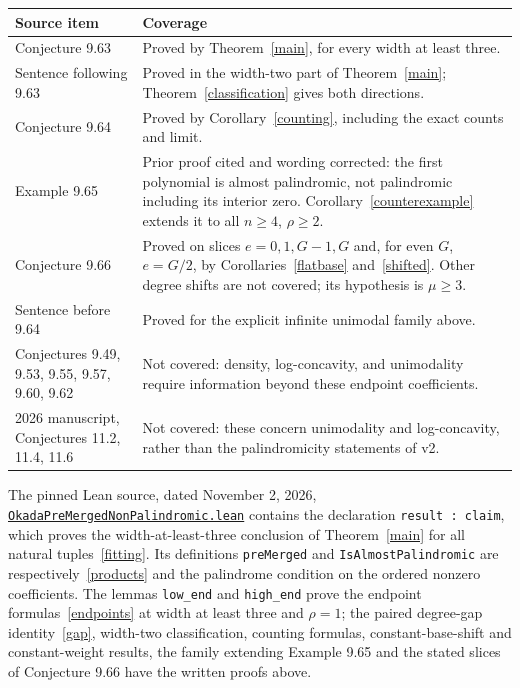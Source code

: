 \documentclass[11pt,a4paper]{article}
\begin{document}
\begin{center}
\small
\begin{tabular}{@{}p{}p{}@{}}
\toprule
Source item & Coverage\\
\midrule
Conjecture 9.63 & Proved by Theorem~\ref{main}, for every width at least three.\\[3pt]
Sentence following 9.63 & Proved in the width-two part of Theorem~\ref{main};
Theorem~\ref{classification} gives both directions.\\[3pt]
Conjecture 9.64 & Proved by Corollary~\ref{counting}, including the exact counts and limit.\\[3pt]
Example 9.65 & Prior proof cited and wording corrected: the first
polynomial is almost palindromic, not palindromic including its interior zero.
Corollary~\ref{counterexample} extends it to all $n\ge4$, $\rho\ge2$.\\[3pt]
Conjecture 9.66 & Proved on slices $e=0,1,G-1,G$ and, for even $G$,
$e=G/2$, by Corollaries~\ref{flatbase} and~\ref{shifted}.
Other degree shifts are not covered; its hypothesis is $\mu\ge3$.\\[3pt]
Sentence before 9.64 & Proved for the explicit infinite unimodal family above.\\[3pt]
Conjectures 9.49, 9.53, 9.55, 9.57, 9.60, 9.62 & Not covered: density,
log-concavity, and unimodality require information beyond these endpoint coefficients.\\[3pt]
2026 manuscript, Conjectures 11.2, 11.4, 11.6 & Not covered: these concern
unimodality and log-concavity, rather than the palindromicity statements of v2.\\
\bottomrule
\end{tabular}
\end{center}

The pinned Lean source, dated November 2, 2026,
\href{https://github.com/the-omega-institute/trureturing/blob/0b3d3a2945e69db04f778eb6fea96ee6a8030a45/D5/S3/Combinatorics/GaussianQuotient/OkadaPreMergedNonPalindromic.lean}{\texttt{OkadaPreMergedNonPalindromic.lean}}
contains the declaration \texttt{result : claim}, which proves the
width-at-least-three conclusion of Theorem~\ref{main} for all natural
tuples~\eqref{fitting}. Its definitions \texttt{preMerged} and
\texttt{IsAlmostPalindromic} are respectively~\eqref{products} and the
palindrome condition on the ordered nonzero coefficients.
The lemmas \texttt{low\_end} and \texttt{high\_end} prove the
endpoint formulas~\eqref{endpoints} at width at least three and $\rho=1$;
the paired degree-gap identity~\eqref{gap}, width-two classification,
counting formulas, constant-base-shift and constant-weight results,
the family extending Example 9.65 and the stated slices of Conjecture 9.66
have the written proofs above.
\end{document}
